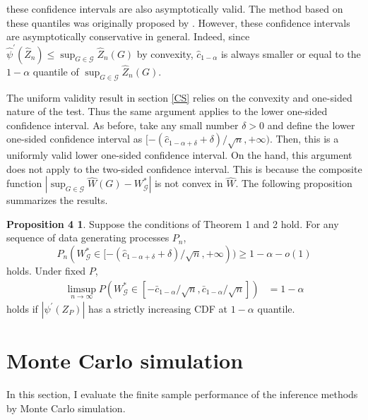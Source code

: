 \documentclass[12pt,oneside,reqno,english]{amsart}
\theoremstyle{definition}
\newtheorem*{prop1}{Proposition 4}
\begin{document}
these confidence intervals are also asymptotically valid. The method based on these quantiles was originally proposed by \cite{KT:18}. 
However, these confidence intervals are asymptotically conservative in general. 
Indeed, since $\hat{\psi}^{\prime}(\hat{Z}_{n})\leq \sup_{G\in \mathcal{G}}\hat{Z}_{n}(G)$ by convexity, 
$\hat{c}_{1-\alpha}$ is always smaller or equal to the $1-\alpha$ quantile of  $\sup_{G\in \mathcal{G}}\hat{Z}_{n}(G)$.



The uniform validity result in section \ref{CS} relies on the convexity and one-sided nature of the test. 
Thus the same argument applies to the lower one-sided confidence interval. 
As before, take any small number $\delta>0$ and define the lower one-sided confidence interval as $[-(\hat{c}_{1-\alpha+\delta}+\delta)/\sqrt{n}, +\infty)$. Then, this is a uniformly valid lower one-sided confidence interval. 
On the hand, this argument does not apply to the two-sided confidence interval. This is because 
the composite function $\left|\sup_{G\in \mathcal{G}}\hat{W}(G)-W^{*}_{\mathcal{G}}\right|$ is not convex in $\hat{W}$. 
The following proposition summarizes the results.
\begin{prop1} 
Suppose the conditions of Theorem 1 and 2 hold. 
For any sequence of data generating processes $P_{n}$,
\[P_{n}(W^{*}_{\mathcal{G}}\in [-(\hat{c}_{1-\alpha+\delta}+\delta)/\sqrt{n}, +\infty ) )\geq 1-\alpha-o(1)\]
holds. Under fixed $P$, 
\begin{align*}
\limsup_{n\rightarrow \infty} P(W^{*}_{\mathcal{G}}\in [-\bar{c}_{1-\alpha}/\sqrt{n},\bar{c}_{1-\alpha}/\sqrt{n}])&=1-\alpha
\end{align*}
holds if $|\psi^{\prime}(Z_{P})|$ has a strictly increasing CDF at $1-\alpha$ quantile. 
\end{prop1}

\section{Monte Carlo simulation}\label{sim}
In this section, I evaluate the finite sample performance of the inference methods by Monte Carlo simulation. 
\end{document}
